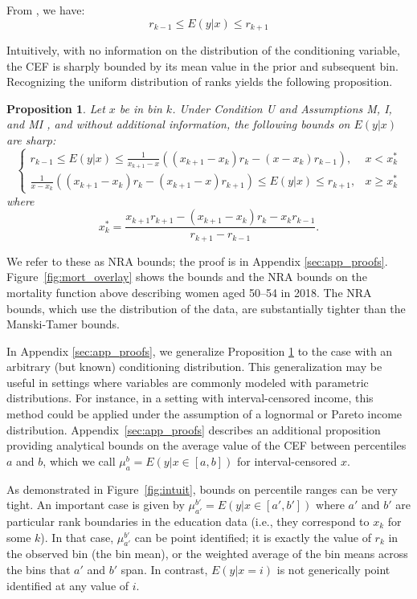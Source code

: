 \documentclass[12pt,letterpaper]{article}
\newtheorem{proposition}{Proposition}
\numberwithin{equation}{section}
\begin{document}
From \citet{Manski2002}, we have: 
\begin{equation}
  r_{k-1} \leq E(y | x) \leq r_{k+1}
  \tag{Manski-Tamer bounds} 
\end{equation}

Intuitively, with no information on the distribution of the conditioning variable, the CEF is sharply bounded by its mean value in the prior and subsequent bin.  Recognizing the uniform distribution of ranks yields the following proposition.

\begin{proposition}
  \label{eq:cef_bound}
\nonumber
  Let $x$ be in bin $k$. Under Condition U and Assumptions M, I, and MI \citep{Manski2002},
  and without additional information, the
  following bounds on $E(y \vert x)$ are sharp:
  $$
  \begin{cases}
    r_{k-1} \leq E(y \vert x) \leq \frac{1}{x_{k+1} - x} \left(
    \left(x_{k+1} - x_k\right) r_k - \left(x - x_k\right) r_{k-1} \right), & x < x_k^* \\
    \frac{1}{x - x_k} \left( \left(x_{k+1} - x_k\right) r_k -
    \left(x_{k+1} - x\right) r_{k+1} \right) \leq E(y \vert x) \leq r_{k+1}, & x \geq x_k^*
  \end{cases}
  $$
  where $$x_k^* = \frac{x_{k+1} r_{k+1}
    - \left(x_{k+1} - x_k\right) r_k -
    x_k r_{k-1}  }{r_{k+1} - r_{k-1} }.$$ 
\end{proposition} 

We refer to these as NRA bounds; the proof is in Appendix
\ref{sec:app_proofs}. Figure~\ref{fig:mort_overlay} shows
the \citet{Manski2002} bounds and the NRA bounds on the mortality
function above describing women aged 50--54 in 2018. The NRA bounds, which use the distribution of the data, are substantially tighter than the Manski-Tamer bounds.

In Appendix \ref{sec:app_proofs}, we generalize Proposition \ref{eq:cef_bound} to the case with an arbitrary (but known) conditioning distribution. This generalization may be useful in settings where variables are commonly modeled with parametric distributions. For instance, in a setting with interval-censored income, this method could be applied under the assumption of a lognormal or Pareto income distribution. Appendix~\ref{sec:app_proofs} describes an additional proposition
providing analytical bounds on the average value of the CEF between
percentiles $a$ and $b$, which we call $\mu_a^b = E(y | x \in [a,b])$
for interval-censored $x$. 

As demonstrated in Figure~\ref{fig:intuit}, bounds on percentile ranges can be very
tight. An important case is given by $\mu_{a'}^{b'} = E(y|x \in
[a',b'])$ where $a'$ and $b'$ are particular rank boundaries in the education
data (i.e., they correspond to $x_k$ for some $k$). In that case, $\mu_{a'}^{b'}$ can be point identified; it is exactly
the value of $r_k$ in the observed bin (the bin mean), or the weighted average of the
bin means across the bins that $a'$ and $b'$ span. In contrast,
$E(y|x=i)$ is not generically point identified at any value of $i$.
\end{document}
